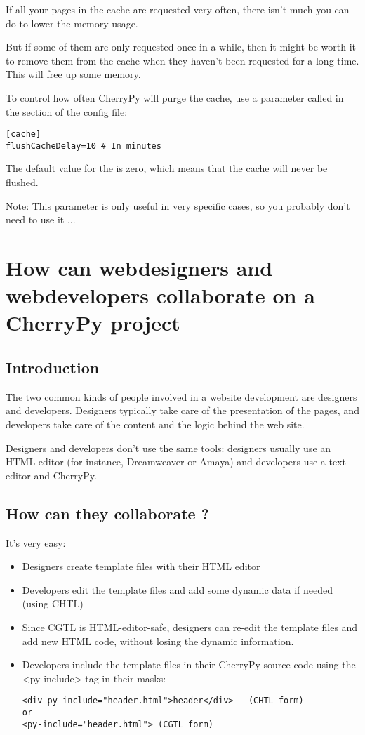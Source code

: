 \documentclass{manual}
\begin{document}
If all your pages in the cache are requested very often, there isn't much you can do to lower the memory usage.

But if some of them are only requested once in a while, then it might be worth it to remove them from the cache
when they haven't been requested for a long time. This will free up some memory.

To control how often CherryPy will purge the cache, use a parameter called  in the section 
of the config file:
\begin{verbatim}
[cache]
flushCacheDelay=10 # In minutes
\end{verbatim}
The default value for the  is zero, which means that the cache will never be flushed.

Note: This parameter is only useful in very specific cases, so you probably don't need to use it ...

\chapter{How can webdesigners and webdevelopers collaborate on a CherryPy project}
\section{Introduction}
The two common kinds of people involved in a website development are designers and developers. Designers typically take care
of the presentation of the pages, and developers take care of the content and the logic behind the web site.

Designers and developers don't use the same tools: designers usually use an HTML editor (for instance, Dreamweaver or Amaya)
and developers use a text editor and CherryPy.

\section{How can they collaborate ?}
It's very easy:
\begin{itemize}
\item
Designers create template files with their HTML editor
\item
Developers edit the template files and add some dynamic data if needed (using CHTL)
\item
Since CGTL is HTML-editor-safe, designers can re-edit the template files and add new HTML code, without losing the dynamic
information.
\item
Developers include the template files in their CherryPy source code using the <py-include> tag in their masks:
\begin{verbatim}
<div py-include="header.html">header</div>   (CHTL form)
or
<py-include="header.html"> (CGTL form)
\end{verbatim}
\end{itemize}
\end{document}
